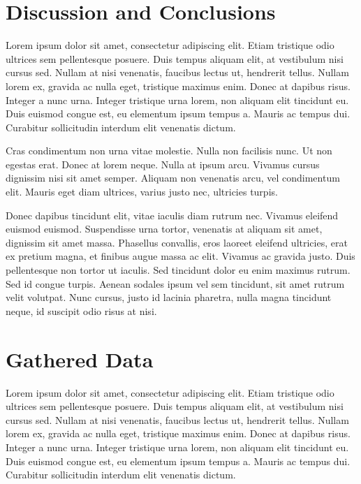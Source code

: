 \documentclass[11pt, a4paper]{resources/JTH}
\begin{document}
\section{Discussion and Conclusions}
\label{chap:DiscussionConclusions}

Lorem ipsum dolor sit amet, consectetur adipiscing elit. Etiam tristique odio ultrices sem pellentesque posuere. Duis tempus aliquam elit, at vestibulum nisi cursus sed. Nullam at nisi venenatis, faucibus lectus ut, hendrerit tellus. Nullam lorem ex, gravida ac nulla eget, tristique maximus enim. Donec at dapibus risus. Integer a nunc urna. Integer tristique urna lorem, non aliquam elit tincidunt eu. Duis euismod congue est, eu elementum ipsum tempus a. Mauris ac tempus dui. Curabitur sollicitudin interdum elit venenatis dictum.

Cras condimentum non urna vitae molestie. Nulla non facilisis nunc. Ut non egestas erat. Donec at lorem neque. Nulla at ipsum arcu. Vivamus cursus dignissim nisi sit amet semper. Aliquam non venenatis arcu, vel condimentum elit. Mauris eget diam ultrices, varius justo nec, ultricies turpis.

Donec dapibus tincidunt elit, vitae iaculis diam rutrum nec. Vivamus eleifend euismod euismod. Suspendisse urna tortor, venenatis at aliquam sit amet, dignissim sit amet massa. Phasellus convallis, eros laoreet eleifend ultricies, erat ex pretium magna, et finibus augue massa ac elit. Vivamus ac gravida justo. Duis pellentesque non tortor ut iaculis. Sed tincidunt dolor eu enim maximus rutrum. Sed id congue turpis. Aenean sodales ipsum vel sem tincidunt, sit amet rutrum velit volutpat. Nunc cursus, justo id lacinia pharetra, nulla magna tincidunt neque, id suscipit odio risus at nisi.

\newpage



\newpage
\appendix

\section{Gathered Data}
\label{chap:data}

Lorem ipsum dolor sit amet, consectetur adipiscing elit. Etiam tristique odio ultrices sem pellentesque posuere. Duis tempus aliquam elit, at vestibulum nisi cursus sed. Nullam at nisi venenatis, faucibus lectus ut, hendrerit tellus. Nullam lorem ex, gravida ac nulla eget, tristique maximus enim. Donec at dapibus risus. Integer a nunc urna. Integer tristique urna lorem, non aliquam elit tincidunt eu. Duis euismod congue est, eu elementum ipsum tempus a. Mauris ac tempus dui. Curabitur sollicitudin interdum elit venenatis dictum.
\end{document}
